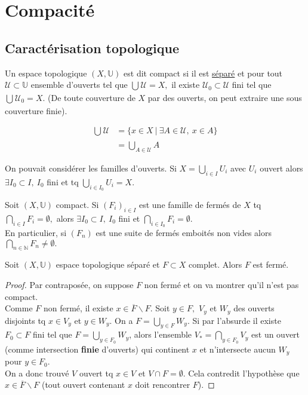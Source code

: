 \section{Compacité}
\subsection{Caractérisation topologique}
\begin{definition}
    Un espace topologique $(X,\mathbb{U})$ est dit compact si il est \underline{séparé} et pour tout $\mathcal{U}\subset \mathbb{U}$ ensemble d'ouverts tel que $\bigcup\limits_{} \mathcal{U}=X,$ il existe $\mathcal{U}_0\subset \mathcal{U}$ fini tel que $\bigcup\limits_{} \mathcal{U}_0=X$. (De toute couverture de $X$ par des ouverts, on peut extraire une sous couverture finie).
\end{definition}
\begin{remarque}
    \begin{align*}
        \bigcup\limits_{} \mathcal{U}&=\{x\in X\ |\ \exists A\in \mathcal{U},\ x\in A\}\\
                                     &=\bigcup\limits_{A\in \mathcal{U}} A
     \end{align*}
\end{remarque}
\begin{remarque}
    On pouvait considérer les familles d'ouverts. Si $X=\bigcup\limits_{i\in I} U_i$ avec $U_i$ ouvert alors $\exists I_0\subset I,\ I_0 $ fini et tq $\bigcup\limits_{i\in I_0} U_i=X$.
\end{remarque}
\begin{remarque}
   Soit $(X,\mathbb{U})$ compact. Si $(F_i)_{i\in I}$ est une famille de fermés de $X$ tq $\bigcap\limits_{i\in I} F_i=\emptyset ,$ alors $\exists I_0\subset I,\ I_0$ fini et $\bigcap\limits_{i\in I_0} F_i=\emptyset $.\\
   En particulier, si $(F_n)$ est une suite de fermés emboités non vides alors $\bigcap\limits_{n\in \mathbb{N} } F_n\neq \emptyset .$
\end{remarque}
\begin{lemme}
    Soit $(X,\mathbb{U})$ espace topologique séparé et $F\subset X$ complet. Alors $F$ est fermé.
\end{lemme}
\begin{proof}
    Par contraposée, on suppose $F$ non fermé et on va montrer qu'il n'est pas compact.\\
    Comme $F$ non fermé, il existe $x\in \overline{F}\backslash F.$ Soit $y\in F,$ $V_y$ et $W_y$ des ouverts disjoints tq $x\in V_y$ et $y\in W_y.$ On a $F=\bigcup\limits_{y\in F} W_y$. Si par l'absurde il existe $F_0\subset F$ fini tel que $F=\bigcup\limits_{y\in F_0} W_y$, alors l'ensemble $V_*=\bigcap\limits_{y\in F_0} V_y$ est un ouvert (comme intersection \textbf{finie} d'ouverts) qui continent $x$ et n'intersecte aucun $W_y$ pour $y\in F_0.$ \\
    On a donc trouvé $V$ ouvert tq $x\in V$ et $V\cap F=\emptyset $. Cela contredit l'hypothèse que $x\in \overline{F}\backslash F$ (tout ouvert contenant $x$ doit rencontrer $F$).
\end{proof}
